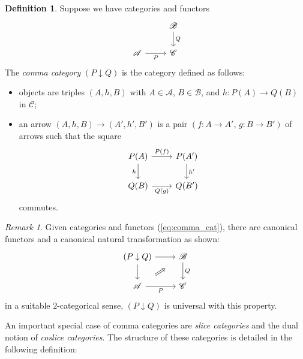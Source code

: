 \documentclass[10pt,oneside]{book}
\def\~#1{\mathscr{#1}}
\theoremstyle{plain}
\theoremstyle{definition}
\newtheorem{defn}[thm]{Definition}
\theoremstyle{remark}
\newtheorem*{rmk}{Remark}
\numberwithin{equation}{section}
\numberwithin{figure}{section}
\begin{document}
\begin{defn}
    Suppose we have categories and functors 
    \begin{equation}
    \label{eq:comma_cat}
    \begin{tikzcd}
    & {\~B} \\
    {\~A} & {\~C}
    \arrow["Q", from=1-2, to=2-2]
    \arrow["P"', from=2-1, to=2-2]
\end{tikzcd}\end{equation}
The \emph{comma category} $(P \downarrow Q)$ is the category defined as follows:
\begin{itemize}
    \item objects are triples $(A, h, B)$ with $A \in \~A$, $B \in \~B$, and $h: P(A) \to Q(B)$ in $\~C$;
    \item an arrow $(A, h , B) \to (A', h', B')$ is a pair $(f: A \to A', \, g: B \to B')$ of arrows such that the square 
    \[\begin{tikzcd}
    {P(A)} & {P(A')} \\
    {Q(B)} & {Q(B')}
    \arrow["{P(f)}", from=1-1, to=1-2]
    \arrow["h"', from=1-1, to=2-1]
    \arrow["{h'}", from=1-2, to=2-2]
    \arrow["{Q(g)}"', from=2-1, to=2-2]
\end{tikzcd}\]
commutes.
\end{itemize}
\end{defn}

\begin{rmk}
    Given categories and functors (\ref{eq:comma_cat}), there are canonical functors and a canonical natural transformation as shown:
    \[\begin{tikzcd}
    {(P \downarrow Q)} & {\~B} \\
    {\~A} & {\~C}
    \arrow[from=1-1, to=1-2]
    \arrow[from=1-1, to=2-1]
    \arrow["Q",from=1-2, to=2-2]
    \arrow[shorten <=14pt, shorten >=14pt, Rightarrow, from=2-1, to=1-2]
    \arrow["P"',from=2-1, to=2-2]
\end{tikzcd}\]
in a suitable $2$-categorical sense, $(P \downarrow Q)$ is universal with this property.
\end{rmk}

An important special case of comma categories are \emph{slice categories} and the dual notion of \emph{coslice categories}. The structure of these categories is detailed in the following definition:
\end{document}
